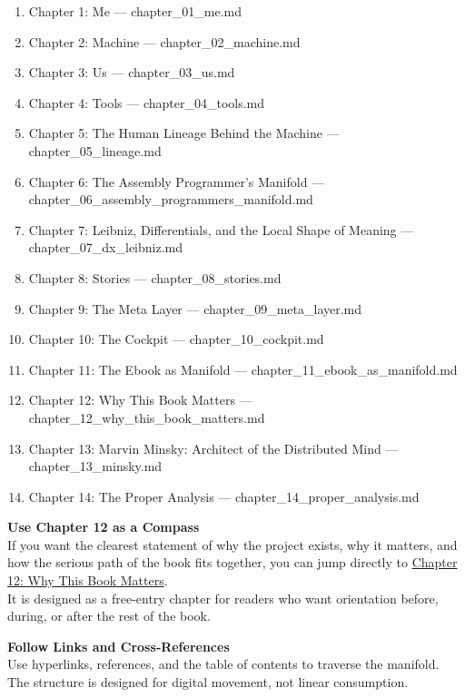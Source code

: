 \documentclass[
]{article}
\providecommand{\tightlist}{%
  \setlength{\itemsep}{0pt}\setlength{\parskip}{0pt}}
\begin{document}
\begin{enumerate}
\def\labelenumi{\arabic{enumi}.}
\tightlist
\item
  Chapter 1: Me --- chapter\_01\_me.md
\item
  Chapter 2: Machine --- chapter\_02\_machine.md
\item
  Chapter 3: Us --- chapter\_03\_us.md
\item
  Chapter 4: Tools --- chapter\_04\_tools.md
\item
  Chapter 5: The Human Lineage Behind the Machine ---
  chapter\_05\_lineage.md
\item
  Chapter 6: The Assembly Programmer's Manifold ---
  chapter\_06\_assembly\_programmers\_manifold.md
\item
  Chapter 7: Leibniz, Differentials, and the Local Shape of Meaning ---
  chapter\_07\_dx\_leibniz.md
\item
  Chapter 8: Stories --- chapter\_08\_stories.md
\item
  Chapter 9: The Meta Layer --- chapter\_09\_meta\_layer.md
\item
  Chapter 10: The Cockpit --- chapter\_10\_cockpit.md
\item
  Chapter 11: The Ebook as Manifold ---
  chapter\_11\_ebook\_as\_manifold.md
\item
  Chapter 12: Why This Book Matters ---
  chapter\_12\_why\_this\_book\_matters.md
\item
  Chapter 13: Marvin Minsky: Architect of the Distributed Mind ---
  chapter\_13\_minsky.md
\item
  Chapter 14: The Proper Analysis --- chapter\_14\_proper\_analysis.md
\end{enumerate}

\textbf{Use Chapter 12 as a Compass}\\
If you want the clearest statement of why the project exists, why it
matters, and how the serious path of the book fits together, you can
jump directly to \href{chapter_12_why_this_book_matters.md}{Chapter 12:
Why This Book Matters}.\\
It is designed as a free-entry chapter for readers who want orientation
before, during, or after the rest of the book.

\textbf{Follow Links and Cross‑References}\\
Use hyperlinks, references, and the table of contents to traverse the
manifold.\\
The structure is designed for digital movement, not linear consumption.
\end{document}
